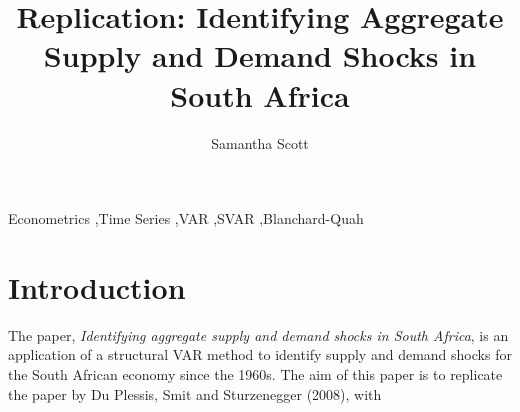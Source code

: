 \documentclass[11pt,preprint, authoryear]{elsarticle}
\numberwithin{equation}{section}
\numberwithin{figure}{section}
\numberwithin{table}{section}
\begin{document}
\begin{frontmatter}  %

\title{Replication: Identifying Aggregate Supply and Demand Shocks in
South Africa}





\author[Add1]{Samantha Scott}





\address[Add1]{Stellenbosch University, Cape Town, South Africa}



\vspace{1cm}


\begin{keyword}
\footnotesize{
Econometrics \sep Time Series \sep VAR \sep SVAR \sep Blanchard-Quah \\
\vspace{0.3cm}
}
\end{keyword}



\vspace{0.5cm}

\end{frontmatter}



\pagestyle{fancy}
\chead{}
\rhead{}
\lfoot{}
\lhead{}
\cfoot{}


\headsep 35pt %




\hypertarget{introduction}{%
\section{Introduction}\label{introduction}}

The paper, \emph{Identifying aggregate supply and demand shocks in South
Africa}, is an application of a structural VAR method to identify supply
and demand shocks for the South African economy since the 1960s. The aim
of this paper is to replicate the paper by Du Plessis, Smit and
Sturzenegger (2008), with
\end{document}
